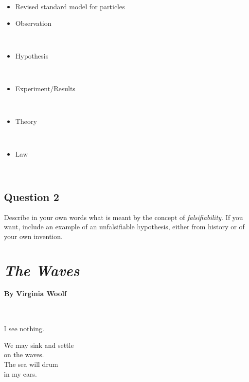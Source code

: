 \documentclass[11pt, letterpaper]{memoir}
\begin{document}
{\begin{minipage}{0.65\textwidth}
\begin{itemize}
		      ~

		\item Revised standard model for particles
	\end{itemize}
\end{minipage}
\begin{minipage}{0.35\textwidth}
	\begin{itemize}
		\item Observation

		      ~

		\item Hypothesis

		      ~

		\item Experiment/Results

		      ~

		\item Theory

		      ~

		\item Law

		      ~

	\end{itemize}
\end{minipage}

\subsection*{Question 2}
Describe in your own words what is meant by the concept of \emph{falsifiability}. If you want, include an example of an unfalsifiable hypothesis, either from history or of your own invention.

\newpage
\pagestyle{empty}
\addtocounter{page}{-1}
\section*{\emph{The Waves}}
\paragraph{By Virginia Woolf}~

\vspace{1em}
\begin{minipage}{0.3\textwidth}
	\begin{center}
		I see nothing.

		We may sink and settle\\
		on the waves.\\
		The sea will drum\\
		in my ears.


\end{center}
\end{minipage}}
\end{document}

